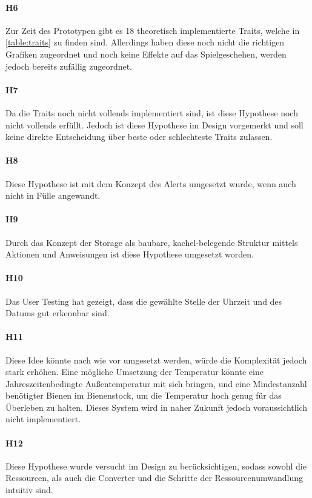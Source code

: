\paragraph*{H6}
Zur Zeit des Prototypen gibt es 18 theoretisch implementierte Traits, welche in \autoref{table:traits} zu finden sind. Allerdings haben diese noch nicht die richtigen Grafiken zugeordnet und noch keine Effekte auf das Spielgeschehen, werden jedoch bereits zufällig zugeordnet.

\paragraph*{H7}
Da die Traits noch nicht vollends implementiert sind, ist diese Hypothese noch nicht vollends erfüllt. Jedoch ist diese Hypothese im Design vorgemerkt und soll keine direkte Entscheidung über beste oder schlechteste Traits zulassen.

\paragraph*{H8}
Diese Hypothese ist mit dem Konzept des Alerts umgesetzt wurde, wenn auch nicht in Fülle angewandt.

\paragraph*{H9}
Durch das Konzept der Storage als baubare, kachel-belegende Struktur mittels Aktionen und Anweisungen ist diese Hypothese umgesetzt worden.

\paragraph*{H10}
Das User Testing hat gezeigt, dass die gewählte Stelle der Uhrzeit und des Datums gut erkennbar sind.

\paragraph*{H11}
Diese Idee könnte nach wie vor umgesetzt werden, würde die Komplexität jedoch stark erhöhen. Eine mögliche Umsetzung der Temperatur könnte eine Jahreszeitenbedingte Außentemperatur mit sich bringen, und eine Mindestanzahl benötigter Bienen im Bienenstock, um die Temperatur hoch genug für das Überleben zu halten. Dieses System wird in naher Zukunft jedoch voraussichtlich nicht implementiert.

\paragraph*{H12}
Diese Hypothese wurde versucht im Design zu berücksichtigen, sodass sowohl die Ressourcen, als auch die Converter und die Schritte der Ressourcenumwandlung intuitiv sind.

